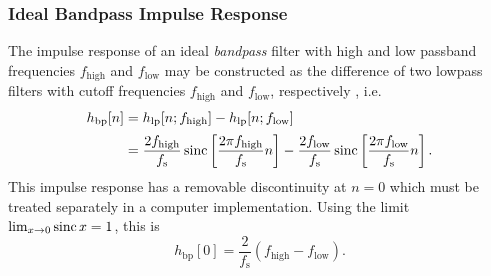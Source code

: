 \subsubsection{Ideal Bandpass Impulse Response}
The impulse response of an ideal \textit{bandpass} filter with high and low passband frequencies $ f_{\mathrm{high}} $ and $ f_{\mathrm{low}} $ may be constructed as the difference of two lowpass filters with cutoff frequencies $ f_{\mathrm{high}} $ and $ f_{\mathrm{low}} $, respectively \cite{ponikvar}, i.e.
\begin{align*}
    h_{\mathrm{bp}}[n] & = h_{\mathrm{lp}}[n; f_{\mathrm{high}}] - h_{\mathrm{lp}}[n; f_{\mathrm{low}}]\\[0.3ex]
    & = \frac{2 f_{\mathrm{high}}}{f_{\mathrm{s}}} \operatorname{sinc} \left[ \frac{2\pi f_{\mathrm{high}}}{f_{\mathrm{s}}}n \right] - \frac{2 f_{\mathrm{low}}}{f_{\mathrm{s}}} \operatorname{sinc} \left[ \frac{2\pi f_{\mathrm{low}}}{f_{\mathrm{s}}} n \right].
\end{align*}
This impulse response has a removable discontinuity at $ n = 0 $ which must be treated separately in a computer implementation. Using the limit $ \lim_{x \to 0} \operatorname{sinc} x = 1 $, this is
\begin{equation*}
    h_{\mathrm{bp}}[0] = \frac{2}{f_{\mathrm{s}}}(f_{\mathrm{high}} - f_{\mathrm{low}}).
\end{equation*}

